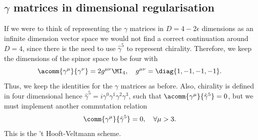 \subsection{\texorpdfstring{$\gamma$}{gamma} matrices in dimensional regularisation}
If we were to think of representing the $\gamma$ matrices in $D = 4 - 2\epsilon$ dimensions as an infinite dimension vector space we would not find a correct continuation around $D = 4$, since there is the need to use $\hat{\gamma}^5$ to represent chirality. Therefore, we keep the dimensions of the spinor space to be four with
\begin{equation}
    \acomm{\gamma^\mu}{\gamma^\nu} = 2g^{\mu\nu}\MI_4,\quad g^{\mu\nu} = \diag{1,-1,-1,-1}.
\end{equation}
Thus, we keep the identities for the $\gamma$ matrices as before. Also, chirality is defined in four dimensional hence $\hat{\gamma}^5 = i\gamma^0\gamma^1\gamma^2\gamma^3$, 
such that $\acomm{\gamma^\mu}{\hat{\gamma}^5} = 0$, but we must implement another commutation relation
\begin{equation}
    \comm{\gamma^\mu}{\hat{\gamma}^5} = 0,\quad \forall \mu > 3.
\end{equation}
This is the 't Hooft-Veltmann scheme. 


